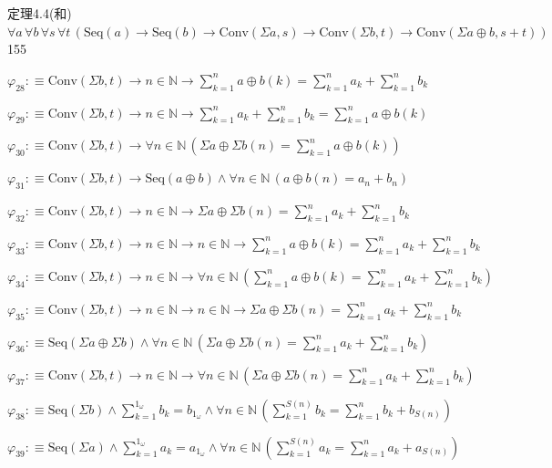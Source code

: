 \begin{fullproof}{定理4.4(和)}{$\forall a\,\forall b\,\forall s\,\forall t\,(\mathrm{Seq}(a) \to \mathrm{Seq}(b) \to \mathrm{Conv}(\Sigma a,s) \to \mathrm{Conv}(\Sigma b,t) \to \mathrm{Conv}(\Sigma a \oplus b,s + t))$}{155}
\begin{abbrevlist}
\item $\varphi_{28} :\equiv \mathrm{Conv}(\Sigma b,t) \to n \in \mathbb{N} \to {\textstyle\sum_{k=1}^{n} a \oplus b(k)} = {\textstyle\sum_{k=1}^{n} a_{k}} + {\textstyle\sum_{k=1}^{n} b_{k}}$
\item $\varphi_{29} :\equiv \mathrm{Conv}(\Sigma b,t) \to n \in \mathbb{N} \to {\textstyle\sum_{k=1}^{n} a_{k}} + {\textstyle\sum_{k=1}^{n} b_{k}} = {\textstyle\sum_{k=1}^{n} a \oplus b(k)}$
\item $\varphi_{30} :\equiv \mathrm{Conv}(\Sigma b,t) \to \forall n \in \mathbb{N}\,(\Sigma a \oplus \Sigma b(n) = {\textstyle\sum_{k=1}^{n} a \oplus b(k)})$
\item $\varphi_{31} :\equiv \mathrm{Conv}(\Sigma b,t) \to \mathrm{Seq}(a \oplus b) \land \forall n \in \mathbb{N}\,(a \oplus b(n) = a_{n} + b_{n})$
\item $\varphi_{32} :\equiv \mathrm{Conv}(\Sigma b,t) \to n \in \mathbb{N} \to \Sigma a \oplus \Sigma b(n) = {\textstyle\sum_{k=1}^{n} a_{k}} + {\textstyle\sum_{k=1}^{n} b_{k}}$
\item $\varphi_{33} :\equiv \mathrm{Conv}(\Sigma b,t) \to n \in \mathbb{N} \to n \in \mathbb{N} \to {\textstyle\sum_{k=1}^{n} a \oplus b(k)} = {\textstyle\sum_{k=1}^{n} a_{k}} + {\textstyle\sum_{k=1}^{n} b_{k}}$
\item $\varphi_{34} :\equiv \mathrm{Conv}(\Sigma b,t) \to n \in \mathbb{N} \to \forall n \in \mathbb{N}\,({\textstyle\sum_{k=1}^{n} a \oplus b(k)} = {\textstyle\sum_{k=1}^{n} a_{k}} + {\textstyle\sum_{k=1}^{n} b_{k}})$
\item $\varphi_{35} :\equiv \mathrm{Conv}(\Sigma b,t) \to n \in \mathbb{N} \to n \in \mathbb{N} \to \Sigma a \oplus \Sigma b(n) = {\textstyle\sum_{k=1}^{n} a_{k}} + {\textstyle\sum_{k=1}^{n} b_{k}}$
\item $\varphi_{36} :\equiv \mathrm{Seq}(\Sigma a \oplus \Sigma b) \land \forall n \in \mathbb{N}\,(\Sigma a \oplus \Sigma b(n) = {\textstyle\sum_{k=1}^{n} a_{k}} + {\textstyle\sum_{k=1}^{n} b_{k}})$
\item $\varphi_{37} :\equiv \mathrm{Conv}(\Sigma b,t) \to n \in \mathbb{N} \to \forall n \in \mathbb{N}\,(\Sigma a \oplus \Sigma b(n) = {\textstyle\sum_{k=1}^{n} a_{k}} + {\textstyle\sum_{k=1}^{n} b_{k}})$
\item $\varphi_{38} :\equiv \mathrm{Seq}(\Sigma b) \land {\textstyle\sum_{k=1}^{1_{\omega}} b_{k}} = b_{1_{\omega}} \land \forall n \in \mathbb{N}\,({\textstyle\sum_{k=1}^{S(n)} b_{k}} = {\textstyle\sum_{k=1}^{n} b_{k}} + b_{S(n)})$
\item $\varphi_{39} :\equiv \mathrm{Seq}(\Sigma a) \land {\textstyle\sum_{k=1}^{1_{\omega}} a_{k}} = a_{1_{\omega}} \land \forall n \in \mathbb{N}\,({\textstyle\sum_{k=1}^{S(n)} a_{k}} = {\textstyle\sum_{k=1}^{n} a_{k}} + a_{S(n)})$

\end{abbrevlist}
\end{fullproof}
